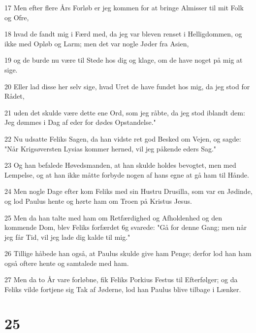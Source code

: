 \par 17 Men efter flere Års Forløb er jeg kommen for at bringe Almisser til mit Folk og Ofre,
\par 18 hvad de fandt mig i Færd med, da jeg var bleven renset i Helligdommen, og ikke med Opløb og Larm; men det var nogle Jøder fra Asien,
\par 19 og de burde nu være til Stede hos dig og klage, om de have noget på mig at sige.
\par 20 Eller lad disse her selv sige, hvad Uret de have fundet hos mig, da jeg stod for Rådet,
\par 21 uden det skulde være dette ene Ord, som jeg råbte, da jeg stod iblandt dem: Jeg dømmes i Dag af eder for dødes Opstandelse."
\par 22 Nu udsatte Feliks Sagen, da han vidste ret god Besked om Vejen, og sagde: "Når Krigsøversten Lysias kommer herned, vil jeg påkende eders Sag."
\par 23 Og han befalede Høvedsmanden, at han skulde holdes bevogtet, men med Lempelse, og at han ikke måtte forbyde nogen af hans egne at gå ham til Hånde.
\par 24 Men nogle Dage efter kom Feliks med sin Hustru Drusilla, som var en Jødinde, og lod Paulus hente og hørte ham om Troen på Kristus Jesus.
\par 25 Men da han talte med ham om Retfærdighed og Afholdenhed og den kommende Dom, blev Feliks forfærdet 6g svarede: "Gå for denne Gang; men når jeg får Tid, vil jeg lade dig kalde til mig."
\par 26 Tillige håbede han også, at Paulus skulde give ham Penge; derfor lod han ham også oftere hente og samtalede med ham.
\par 27 Men da to År vare forløbne, fik Feliks Porkius Festus til Efterfølger; og da Feliks vilde fortjene sig Tak af Jøderne, lod han Paulus blive tilbage i Lænker.

\chapter{25}

